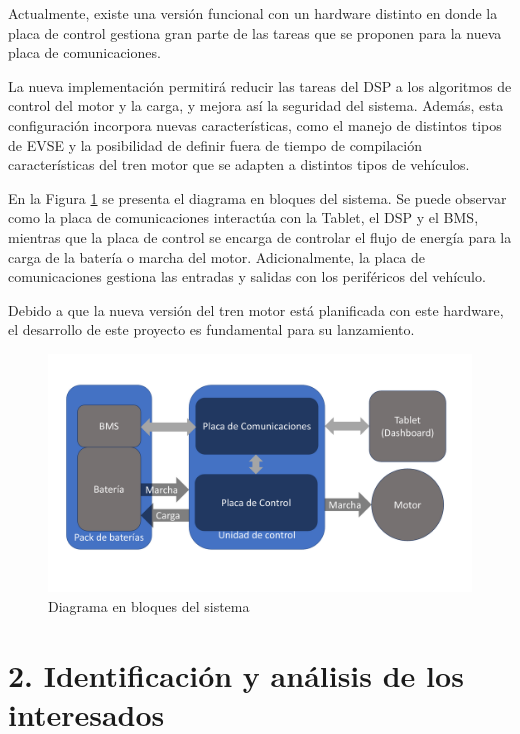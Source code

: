 \documentclass[
11pt, %
codirector, %
]{charter}
\begin{document}
Actualmente, existe una versión funcional con un hardware distinto en donde la placa de control gestiona gran parte de las tareas que se proponen para la nueva placa de comunicaciones.

La nueva implementación permitirá reducir las tareas del DSP a los algoritmos de control del motor y la carga, y mejora así la seguridad del sistema. Además, esta configuración incorpora nuevas características, como el manejo de distintos tipos de EVSE y la posibilidad de definir fuera de tiempo de compilación características del tren motor que se adapten a distintos tipos de vehículos.



En la Figura \ref{fig:diagBloques} se presenta el diagrama en bloques del sistema. Se puede observar como la placa de comunicaciones interactúa con la Tablet, el DSP y el BMS, mientras que la placa de control se encarga de controlar el flujo de energía para la carga de la batería o marcha del motor. Adicionalmente, la placa de comunicaciones gestiona las entradas y salidas con los periféricos del vehículo.

Debido a que la nueva versión del tren motor está planificada con este hardware, el desarrollo de este proyecto es fundamental para su lanzamiento.

\begin{figure}[htpb]
	\centering
	\includegraphics[width=.9\textwidth]{./Figuras/EsquematicoPT.pdf}
	\caption{Diagrama en bloques del sistema}
	\label{fig:diagBloques}
\end{figure}

\vspace{25px}

\section{2. Identificación y análisis de los interesados}
\label{sec:interesados}
\end{document}
